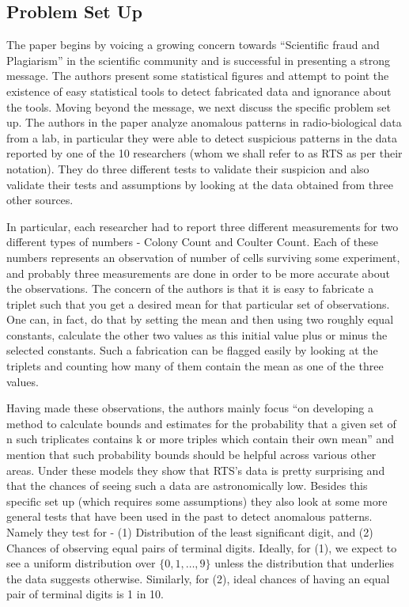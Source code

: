 \documentclass{article}
\begin{document}
\subsection{Problem Set Up}\label{problem-set-up}

The paper begins by voicing a growing concern towards ``Scientific fraud
and Plagiarism'' in the scientific community and is successful in
presenting a strong message. The authors present some statistical figures and attempt to point the existence of easy statistical tools to detect fabricated data and ignorance about the tools. Moving beyond the message, we next discuss the specific problem set up. The authors in the paper analyze anomalous patterns in radio-biological
data from a lab, in particular they were able to detect suspicious
patterns in the data reported by one of the 10 researchers (whom we
shall refer to as RTS as per their notation). They do three different
tests to validate their suspicion and also validate their tests and
assumptions by looking at the data obtained from three other sources.

In particular, each researcher had to report three different measurements for two
different types of numbers - Colony Count and Coulter Count. Each of
these numbers represents an observation of number of cells surviving some
experiment, and probably three measurements are done in order to be more
accurate about the observations. The concern of the authors is that it is easy to fabricate a triplet such that you get a desired mean for that particular set of observations. One can, in
fact, do that by setting the mean and then using two roughly equal
constants, calculate the other two values as this initial value plus or
minus the selected constants. Such a fabrication can be flagged easily
by looking at the triplets and counting how many of them contain the
mean as one of the three values.

Having made these observations, the
authors mainly focus ``on developing a method to calculate bounds and
estimates for the probability that a given set of n such triplicates
contains k or more triples which contain their own mean'' and mention
that such probability bounds should be helpful across various other
areas. Under these models they show that RTS's data is pretty surprising
and that the chances of seeing such a data are astronomically low.
Besides this specific set up (which requires some assumptions) they also
look at some more general tests that have been used in the past to
detect anomalous patterns. Namely they test for - (1) Distribution of
the least significant digit, and (2) Chances of observing equal pairs of
terminal digits. Ideally, for (1), we expect to see a uniform
distribution over \(\{0, 1, \ldots, 9\}\) unless the distribution that
underlies the data suggests otherwise. Similarly, for (2), ideal chances
of having an equal pair of terminal digits is 1 in 10.
\end{document}
